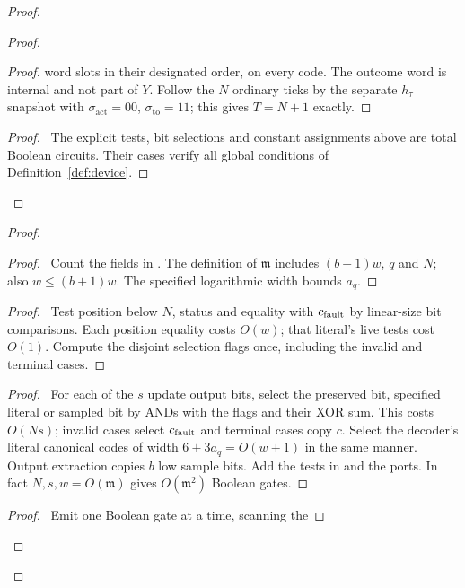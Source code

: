 \begin{proof}
\begin{proof}
\begin{proof}
 word slots in their designated order, on every code. The outcome
 word is internal and not part of $Y$. Follow the $N$ ordinary
 ticks by the separate $h_\tau$ snapshot with
 $\sigma_{\mathrm{act}}=00$, $\sigma_{\mathrm{to}}=11$;
 this gives $T=N+1$ exactly.\end{proof}
 \qedstep
 \begin{proof}\pf\ The explicit tests, bit selections and constant
 assignments above are total Boolean circuits. Their cases verify
 all global conditions of Definition~\ref{def:device}.\end{proof}
\end{proof}
\begin{proof}
 \begin{proof}\pf\ Count the fields in .
 The definition of ${\mathfrak m}$ includes $(b+1)w$, $q$ and $N$; also
 $w\leq(b+1)w$. The specified logarithmic width bounds $a_q$.\end{proof}
 \begin{proof}\pf\ Test position below $N$, status and equality
 with $c_{\rm fault}$ by linear-size bit comparisons. Each position
 equality costs $O(w)$; that literal's live tests cost $O(1)$.
 Compute the disjoint selection flags once, including the invalid
 and terminal cases.\end{proof}
 \begin{proof}\pf\ For each of the $s$ update output bits, select
 the preserved bit, specified literal or sampled bit by ANDs with
 the flags and their XOR sum. This costs $O(Ns)$; invalid cases
 select $c_{\rm fault}$ and terminal cases copy $c$. Select the
 decoder's literal canonical codes of width $6+3a_q=O(w+1)$
 in the same manner. Output extraction copies $b$ low sample bits.
 Add the tests in  and the ports.
 In fact $N,s,w=O({\mathfrak m})$ gives $O({\mathfrak m}^2)$ Boolean gates.\end{proof}
 \begin{proof}\pf\ Emit one Boolean gate at a time, scanning the

\end{proof}
\end{proof}
\end{proof}
